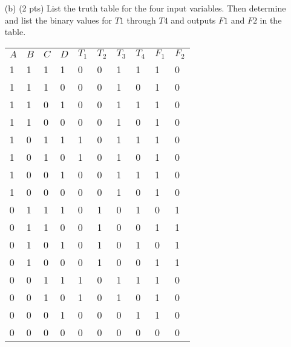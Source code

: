 \documentclass{article}
\begin{document}
\begin{enumerate}
    \item[(b)] (2 pts) List the truth table for the four input variables. Then determine and list the binary values for $T1$ through $T4$ and outputs $F1$ and $F2$ in the table.
        \begin{table}[!htbp]
            \begin{tabular}{llllllllll}
                $A$ & $B$ & $C$ & $D$ & $T_1$ & $T_2$ & $T_3$ & $T_4$ & $F_1$ & $F_2$ \\
                1   & 1   & 1   & 1   & 0     & 0     & 1     & 1     & 1     & 0     \\
                1   & 1   & 1   & 0   & 0     & 0     & 1     & 0     & 1     & 0     \\
                1   & 1   & 0   & 1  & 0     & 0     & 1     & 1     & 1     & 0     \\
                1   & 1   & 0   & 0   & 0     & 0     & 1     & 0     & 1     & 0     \\
                1   & 0   & 1   & 1   & 1     & 0     & 1     & 1     & 1     & 0     \\
                1   & 0   & 1   & 0   & 1     & 0     & 1     & 0     & 1     & 0     \\
                1   & 0   & 0   & 1   & 0     & 0     & 1     & 1     & 1     & 0     \\
                1   & 0   & 0   & 0   & 0     & 0     & 1     & 0     & 1     & 0     \\
                0   & 1   & 1   & 1   & 0     & 1     & 0     & 1     & 0     & 1     \\
                0   & 1   & 1   & 0   & 0     & 1     & 0     & 0     & 1     & 1     \\
                0   & 1   & 0   & 1   & 0     & 1     & 0     & 1     & 0     & 1     \\
                0   & 1   & 0   & 0   & 0     & 1     & 0     & 0     & 1     & 1     \\
                0   & 0   & 1   & 1   & 1     & 0     & 1     & 1     & 1     & 0     \\
                0   & 0   & 1   & 0   & 1     & 0     & 1     & 0     & 1     & 0     \\
                0   & 0   & 0   & 1   & 0     & 0     & 0     & 1     & 1     & 0     \\
                0   & 0   & 0   & 0   & 0     & 0     & 0     & 0     & 0     & 0
            \end{tabular}
        \end{table}


\end{enumerate}
\end{document}
